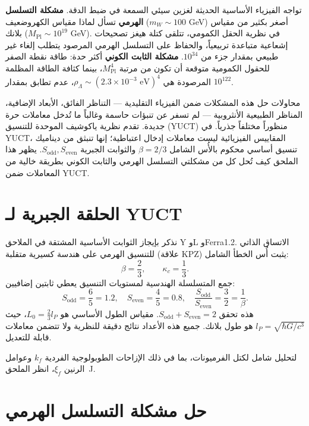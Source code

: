 \documentclass[12pt,a4paper]{article}
\begin{document}
	تواجه الفيزياء الأساسية الحديثة لغزين سيئي السمعة في ضبط الدقة. \textbf{مشكلة التسلسل الهرمي} تسأل لماذا مقياس الكهروضعيف (\(m_W \sim 100\) GeV) أصغر بكثير من مقياس بلانك (\(M_{\mathrm{Pl}} \sim 10^{19}\) GeV). في نظرية الحقل الكمومي، تتلقى كتلة هيغز تصحيحات إشعاعية متباعدة تربيعياً، والحفاظ على التسلسل الهرمي المرصود يتطلب إلغاء غير طبيعي بمقدار جزء من \(10^{34}\). \textbf{مشكلة الثابت الكوني} أكثر حدة: طاقة نقطة الصفر للحقول الكمومية متوقعة أن تكون من مرتبة \(M_{\mathrm{Pl}}^4\)، بينما كثافة الطاقة المظلمة المرصودة هي \(\rho_\Lambda \sim (2.3 \times 10^{-3} \text{ eV})^4\)، عدم تطابق بمقدار \(10^{122}\).
	
	محاولات حل هذه المشكلات ضمن الفيزياء التقليدية — التناظر الفائق، الأبعاد الإضافية، المناظر الطبيعية الأنثروبية — لم تسفر عن تنبؤات حاسمة وغالباً ما تُدخل معاملات حرة جديدة. تقدم نظرية ياكوشيف الموحدة للتنسيق (YUCT) منظوراً مختلفاً جذرياً. في YUCT، المقاييس الفيزيائية ليست معاملات إدخال اعتباطية؛ إنها تنبثق من ديناميك تنسيق أساسي محكوم بالأُس الشامل \(\beta = 2/3\) والثوابت الجبرية \(S_{\mathrm{odd}}, S_{\mathrm{even}}\). يظهر هذا الملحق كيف تُحل كل من مشكلتي التسلسل الهرمي والثابت الكوني بطريقة خالية من المعاملات ضمن YUCT.
	
	\section{الحلقة الجبرية لـ YUCT}
	
	نذكر بإيجاز الثوابت الأساسية المشتقة في الملاحق Y وL وFerra1.2. الاتساق الذاتي للتنسيق الهرمي على هندسة كسيرية متقلبة (علاقة KPZ) يثبت أُس الخطأ الشامل:
	\begin{equation}
		\beta = \frac{2}{3}, \qquad \kappa_c = \frac{1}{3}.
	\end{equation}
	جمع المتسلسلة الهندسية لمستويات التنسيق يعطي ثابتين إضافيين:
	\begin{equation}
		S_{\mathrm{odd}} = \frac{6}{5} = 1.2, \quad S_{\mathrm{even}} = \frac{4}{5} = 0.8, \quad \frac{S_{\mathrm{odd}}}{S_{\mathrm{even}}} = \frac{3}{2} = \frac{1}{\beta}.
	\end{equation}
	هذه تحقق \(S_{\mathrm{odd}} + S_{\mathrm{even}} = 2\). مقياس الطول الأساسي هو \(L_0 = \frac{2}{3} l_P\)، حيث \(l_P = \sqrt{\hbar G / c^3}\) هو طول بلانك. جميع هذه الأعداد نتائج دقيقة للنظرية ولا تتضمن معاملات قابلة للتعديل.
	
	لتحليل شامل لكتل الفرميونات، بما في ذلك الإزاحات الطوبولوجية الفردية \(k_f\) وعوامل الرنين \(\xi_f\)، انظر الملحق~J.
	
	\section{حل مشكلة التسلسل الهرمي}
	
\end{document}
